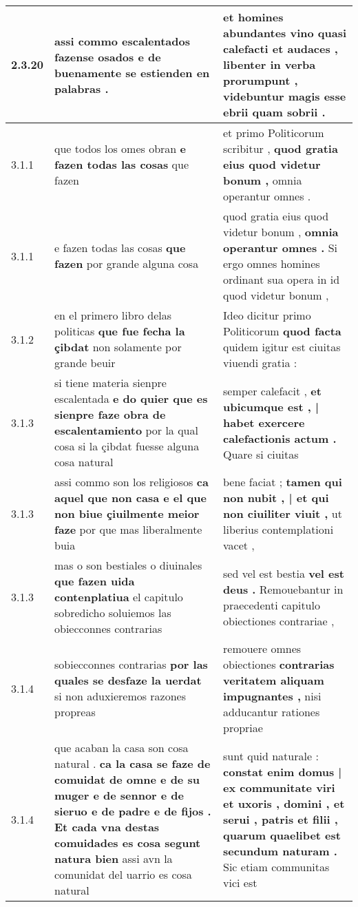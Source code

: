 \begin{tabular}{|p{1cm}|p{6.5cm}|p{6.5cm}|}
2.3.20 & assi commo escalentados \textbf{ fazense osados } e de buenamente se estienden en palabras . & et homines abundantes vino quasi calefacti et audaces , \textbf{ libenter in verba prorumpunt , } videbuntur magis esse ebrii quam sobrii . \\\hline
3.1.1 & que todos los omes obran \textbf{ e fazen todas las cosas } que fazen & et primo Politicorum scribitur , \textbf{ quod gratia eius quod videtur bonum , } omnia operantur omnes . \\\hline
3.1.1 & e fazen todas las cosas \textbf{ que fazen } por grande alguna cosa & quod gratia eius quod videtur bonum , \textbf{ omnia operantur omnes . } Si ergo omnes homines ordinant sua opera in id quod videtur bonum , \\\hline
3.1.2 & en el primero libro delas politicas \textbf{ que fue fecha la çibdat } non solamente por grande beuir & Ideo dicitur primo Politicorum \textbf{ quod facta } quidem igitur est ciuitas viuendi gratia : \\\hline
3.1.3 & si tiene materia sienpre escalentada \textbf{ e do quier que es sienpre faze obra de escalentamiento } por la qual cosa si la çibdat fuesse alguna cosa natural & semper calefacit , \textbf{ et ubicumque est , | habet exercere calefactionis actum . } Quare si ciuitas \\\hline
3.1.3 & assi commo son los religiosos \textbf{ ca aquel que non casa e el que non biue çiuilmente meior faze } por que mas liberalmente buia & bene faciat ; \textbf{ tamen qui non nubit , | et qui non ciuiliter viuit , } ut liberius contemplationi vacet , \\\hline
3.1.3 & mas o son bestiales o diuinales \textbf{ que fazen uida contenplatiua } el capitulo sobredicho soluiemos las obiecconnes contrarias & sed vel est bestia \textbf{ vel est deus . } Remouebantur in praecedenti capitulo obiectiones contrariae , \\\hline
3.1.4 & sobiecconnes contrarias \textbf{ por las quales se desfaze la uerdat } si non aduxieremos razones propreas & remouere omnes obiectiones \textbf{ contrarias veritatem aliquam impugnantes , } nisi adducantur rationes propriae \\\hline
3.1.4 & que acaban la casa son cosa natural . \textbf{ ca la casa se faze de comuidat de omne e de su muger e de sennor e de sieruo e de padre e de fijos . Et cada vna destas comuidades es cosa segunt natura bien } assi avn la comunidat del uarrio es cosa natural & sunt quid naturale : \textbf{ constat enim domus | ex communitate viri et uxoris , domini , et serui , patris et filii , quarum quaelibet est secundum naturam . } Sic etiam communitas vici est \\\hline

\end{tabular}
